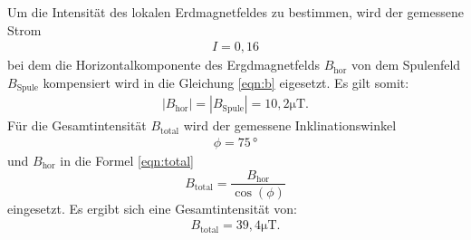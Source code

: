 Um die Intensität des lokalen Erdmagnetfeldes
zu bestimmen, wird der gemessene Strom
\begin{align*}
I=0,16
\end{align*}
bei dem die Horizontalkomponente
des Ergdmagnetfelds $B_\mathrm{hor}$
von dem Spulenfeld $B_\mathrm{Spule} $ kompensiert wird in die
Gleichung \eqref{eqn:b} eigesetzt.
Es gilt somit:
\begin{align*}
|B_\mathrm{hor}|=|B_\mathrm{Spule}|=10,2\si{\micro\tesla} .
\end{align*}
Für die Gesamtintensität $B_\mathrm{total}$
wird der gemessene Inklinationswinkel
\begin{align*}
  \phi=75\,\si{\degree}
\end{align*}
und $B_\mathrm{hor}$ in die Formel \eqref{eqn:total}
\begin{equation}
 B_\mathrm{total}=\frac{B_\mathrm{hor}}{\cos(\phi)} \label{eqn:total}
\end{equation}
eingesetzt.
Es ergibt sich eine Gesamtintensität von:
\begin{align*}
  B_\mathrm{total}=39,4\si{\micro\tesla}.
\end{align*}
